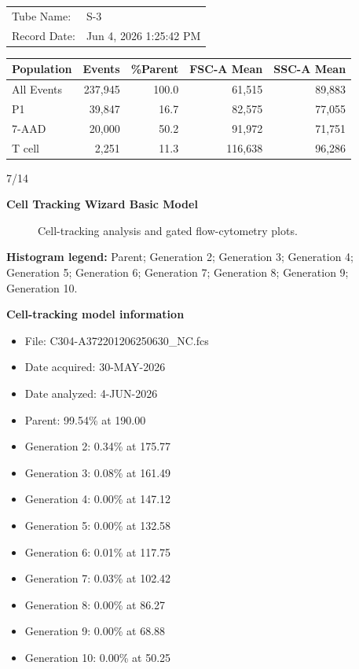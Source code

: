 \documentclass[UTF8,10pt,a4paper,fontset=fandol]{ctexart}
\newcommand{\handwritten}[1]{#1}
\begin{document}
\begin{center}
\begin{tabular}{ll}
Tube Name: & S-3\\
Record Date: & Jun 4, 2026 1:25:42 PM\\
\end{tabular}

\vspace{0.15cm}

\begin{tabular}{lrrrr}
\hline
Population & Events & \%Parent & FSC-A Mean & SSC-A Mean\\
\hline
All Events & 237,945 & 100.0 & 61,515 & 89,883\\
P1 & 39,847 & 16.7 & 82,575 & 77,055\\
7-AAD & 20,000 & 50.2 & 91,972 & 71,751\\
T cell & 2,251 & 11.3 & 116,638 & 96,286\\
\hline
\end{tabular}
\end{center}

\vfill

\handwritten{7/14}

\newpage

\begin{center}
\textbf{Cell Tracking Wizard Basic Model}
\end{center}

\begin{figure}[ht]
\centering
{}
\caption{Cell-tracking analysis and gated flow-cytometry plots.}
\end{figure}

\noindent
\textbf{Histogram legend:} Parent; Generation 2; Generation 3; Generation 4; Generation 5; Generation 6; Generation 7; Generation 8; Generation 9; Generation 10.

\noindent
\textbf{Cell-tracking model information}
\begin{itemize}
    \item File: C304-A372201206250630\_NC.fcs
    \item Date acquired: 30-MAY-2026
    \item Date analyzed: 4-JUN-2026
    \item Parent: 99.54\% at 190.00
    \item Generation 2: 0.34\% at 175.77
    \item Generation 3: 0.08\% at 161.49
    \item Generation 4: 0.00\% at 147.12
    \item Generation 5: 0.00\% at 132.58
    \item Generation 6: 0.01\% at 117.75
    \item Generation 7: 0.03\% at 102.42
    \item Generation 8: 0.00\% at 86.27
    \item Generation 9: 0.00\% at 68.88
    \item Generation 10: 0.00\% at 50.25
\end{itemize}
\end{document}
